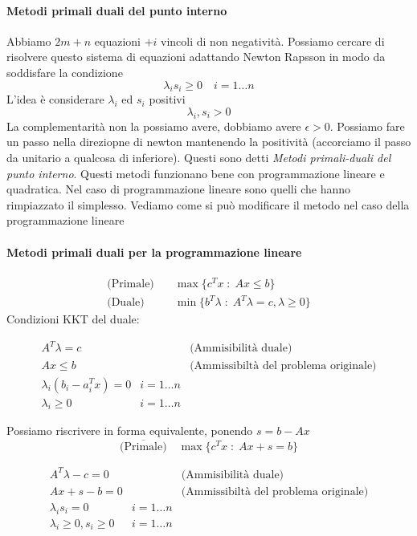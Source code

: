 \paragraph{Metodi primali duali del punto interno}
Abbiamo $2m + n$ equazioni $+ i$ vincoli di non negativit\`a.
Possiamo cercare di risolvere questo sistema di equazioni
adattando Newton Rapsson in modo da soddisfare la condizione
$$ \lambda_i s_i \geq 0 \quad i = 1 \ldots n $$
L'idea \`e considerare $\lambda_i$ ed $s_i$ positivi
$$ \lambda_i, s_i > 0$$
La complementarit\`a non la possiamo avere, dobbiamo avere $\epsilon >
0 $. Possiamo fare un passo nella direziopne di newton mantenendo la
positivit\`a (accorciamo il passo da unitario a qualcosa di
inferiore). Questi sono detti \emph{Metodi primali-duali del punto
interno}.  Questi metodi funzionano bene con programmazione lineare e
quadratica.  Nel caso di programmazione lineare sono quelli che hanno
rimpiazzato il simplesso. Vediamo come si pu\`o modificare il metodo
nel caso della programmazione lineare
\paragraph{Metodi primali duali per la programmazione lineare}
 $$
\begin{array}{ll}
\text{(Primale)} \quad &  \max \{c^{T}x \; : \; Ax  \leq b \} \\
 \text{(Duale)}  &  \min \{ b^{T} \lambda \; : \; A^{T}\lambda = c ,
                          \lambda \geq 0 \}
\end{array}
$$
Condizioni KKT del duale:
\begin{center}
\fbox
{
 \begin{minipage}[position]{0.75\textwidth}
$$
\begin{array}{lll}
A^{T}\lambda = c & & \text{(Ammisibilit\`a duale)}  \\
 Ax \leq b & &  \text{(Ammissibilt\`a del problema originale)} \\
 \lambda_i (b_i - a_i^{T}x) = 0 & i=1\ldots n & \\
 \lambda_i \geq 0 & i=1\ldots n  &
\end{array}
$$
\end{minipage}
}
\end{center}

Possiamo riscrivere in forma equivalente, ponendo $s=b-Ax$
$$ \overline{\text{(Primale)}} \quad   \max \{c^{T}x \; : \; Ax +s =  b \}$$

\begin{center}
\fbox
{
 \begin{minipage}[position]{0.75\textwidth}
$$
\begin{array}{lll}
A^{T}\lambda  -c = 0 & & \text{(Ammisibilit\`a duale)}  \\
 Ax +s - b = 0 & &  \text{(Ammissibilt\`a del problema originale)} \\
 \lambda_i  s_i = 0 & i=1\ldots n & \\
 \lambda_i \geq 0, s_i \geq 0 & i=1\ldots n  &
\end{array}
$$
\end{minipage}
}
\end{center}

